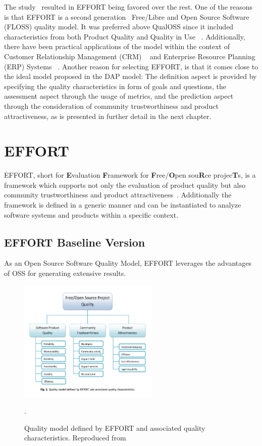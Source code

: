 The study~\cite{sqm_comparison} resulted in EFFORT being favored over the rest. One of the
reasons is that EFFORT is a second generation~\cite{difference_between_2_generation} Free/Libre and Open Source
Software (FLOSS) quality model. It was preferred above QualOSS since it included
characteristics from both Product Quality and Quality in Use ~\cite{sqm_comparison}.
Additionally, there have been practical applications of the model within
the context of Customer Relationship Management (CRM)
~\cite{effort_crm} and Enterprise Resource Planning (ERP) Systems
~\cite{effort}. Another reason for selecting EFFORT, is that it comes
close to the ideal model proposed in the DAP model: The definition
aspect is provided by specifying the quality characteristics in form of
goals and questions, the assessment aspect through the usage of metrics,
and the prediction aspect through the consideration of community
trustworthiness and product attractiveness, as is presented in further
detail in the next chapter.

\clearpage
\hypertarget{effort}{%
\chapter{EFFORT}\label{effort}}

EFFORT, short for \textbf{E}valuation \textbf{F}ramework for
\textbf{F}ree/\textbf{O}pen sou\textbf{R}ce projec\textbf{T}s, is
a framework which supports not only the evaluation of product quality but also
community trustworthiness and product attractiveness~\cite{effort}. Additionally
the framework is defined in a generic manner and can be instantiated to
analyze software systems and products within a specific context.

\hypertarget{the-effort-baseline-version}{%
\section{EFFORT Baseline
Version}\label{the-effort-baseline-version}}

As an Open Source Software Quality Model, EFFORT leverages the
advantages of OSS for generating extensive results.

\begin{figure}[h!]
    \centering
    \includegraphics[width=0.6\textwidth]{images/Untitled_18.png}
    \caption{Quality model defined by EFFORT and associated quality characteristics. Reproduced from ~\cite{effort}}
    \label{image_effort_characteristic}.
\end{figure}

